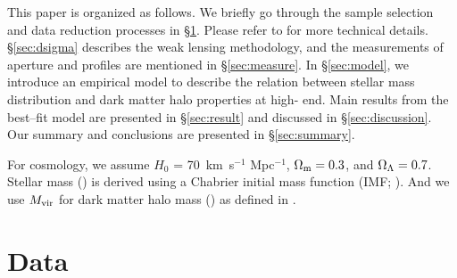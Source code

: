 \documentclass[a4paper,fleqn,usenatbib]{mnras}
\begin{document}
    

    This paper is organized as follows. 
    We briefly go through the sample selection and data reduction processes in 
    \S \ref{sec:data}.  
    Please refer to  for more technical details.
    \S \ref{sec:dsigma} describes the weak lensing methodology, and the 
    measurements of aperture \mstar{} and \mden{} profiles are mentioned in 
    \S \ref{sec:measure}.
    In \S \ref{sec:model}, we introduce an empirical model to describe the relation
    between stellar mass distribution and dark matter halo properties at 
    high-\mstar{} end. 
    Main results from the best--fit model are presented in \S \ref{sec:result} and 
    discussed in \S \ref{sec:discussion}. 
    Our summary and conclusions are presented in \S \ref{sec:summary}.

    
    For cosmology, we assume $H_0$ = 70~km~s$^{-1}$ Mpc$^{-1}$, 
    ${\Omega}_{\rm m}=0.3$, and ${\Omega}_{\rm \Lambda}=0.7$.
    Stellar mass (\mstar{}) is derived using a Chabrier initial mass function 
    (IMF; \citealt{Chabrier2003}). 
    And we use $M_{\rm vir}$ for dark matter halo mass (\mhalo{}) as 
    defined in \citealt{BryanNorman1998}.
    


\section{Data}
    \label{sec:data}
    
\end{document}
